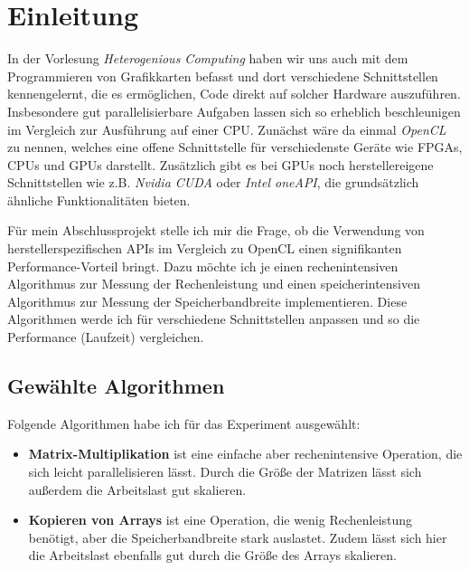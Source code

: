 \documentclass[12pt]{article}
\date{}
\begin{document}
	\section*{Einleitung}
	In der Vorlesung \emph{Heterogenious Computing} haben wir uns auch mit dem Programmieren von Grafikkarten befasst und dort verschiedene Schnittstellen kennengelernt, die es ermöglichen, Code direkt auf solcher Hardware auszuführen.
	Insbesondere gut parallelisierbare Aufgaben lassen sich so erheblich beschleunigen im Vergleich zur Ausführung auf einer CPU.
	Zunächst wäre da einmal \emph{OpenCL} zu nennen, welches eine offene Schnittstelle für verschiedenste Geräte wie FPGAs, CPUs und GPUs darstellt.
	Zusätzlich gibt es bei GPUs noch herstellereigene Schnittstellen wie z.B. \emph{Nvidia CUDA} oder \emph{Intel oneAPI}, die grundsätzlich ähnliche Funktionalitäten bieten.
	
	Für mein Abschlussprojekt stelle ich mir die Frage, ob die Verwendung von herstellerspezifischen APIs im Vergleich zu OpenCL einen signifikanten Performance-Vorteil bringt.
	Dazu möchte ich je einen rechenintensiven Algorithmus zur Messung der Rechenleistung und einen speicherintensiven Algorithmus zur Messung der Speicherbandbreite implementieren.
	Diese Algorithmen werde ich für verschiedene Schnittstellen anpassen und so die Performance (Laufzeit) vergleichen.
	
	\subsection*{Gewählte Algorithmen}
	Folgende Algorithmen habe ich für das Experiment ausgewählt:
	
	\begin{itemize}
		\item \textbf{Matrix-Multiplikation} ist eine einfache aber rechenintensive Operation, die sich leicht parallelisieren lässt. Durch die Größe der Matrizen lässt sich außerdem die Arbeitslast gut skalieren.
		\item \textbf{Kopieren von Arrays} ist eine Operation, die wenig Rechenleistung benötigt, aber die Speicherbandbreite stark auslastet. Zudem lässt sich hier die Arbeitslast ebenfalls gut durch die Größe des Arrays skalieren.
	\end{itemize}
	
	
	
	
	
	
	
	
	
	
	
	
	
	
	
	
	
	
	
	
\end{document}

